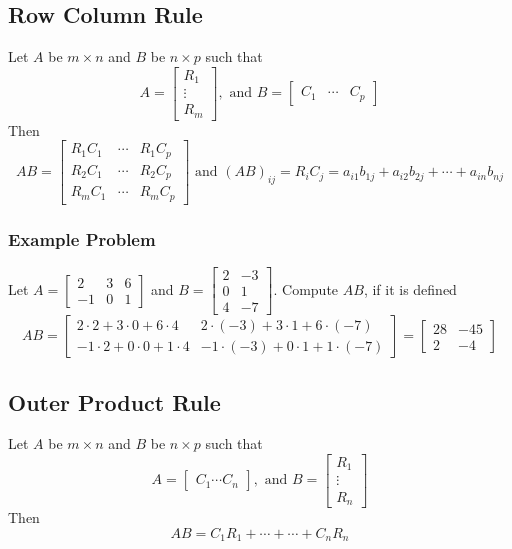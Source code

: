 \subsection{Row Column Rule}
Let $A$ be $m \times n$ and $B$ be $n \times p$ such that 
\[
  A = \begin{bmatrix}
    R_1 \\ \vdots \\ R_m
  \end{bmatrix}, \text{ and }
  B = \begin{bmatrix}
    C_1 & \cdots & C_p
  \end{bmatrix}
\]
Then 
\[
  AB = \begin{bmatrix}
    R_1C_1 & \cdots & R_1C_p \\
    R_2C_1 & \cdots & R_2C_p \\
    R_mC_1 & \cdots & R_mC_p
  \end{bmatrix} \text{ and }
  (AB)_{ij} = R_iC_j = a_{i1}b_{1j} + a_{i2}b_{2j} + \cdots 
  + a_{in}b_{nj}
\]
\subsubsection{Example Problem}
Let $A = \begin{bmatrix}
  2 & 3 & 6 \\
  -1 & 0 & 1
\end{bmatrix}$ and $B = \begin{bmatrix}
  2 & -3 \\
  0 & 1 \\
  4 & -7
\end{bmatrix}.$ Compute $AB$, if it is defined
\[
  AB = \begin{bmatrix}
    2 \cdot 2 + 3 \cdot 0 + 6 \cdot 4 & 2 \cdot (-3) + 3 \cdot 1 + 6 \cdot (-7) \\
    -1 \cdot 2 + 0 \cdot 0 + 1 \cdot 4 & -1 \cdot (-3) + 0 \cdot 1 + 1 \cdot (-7)
  \end{bmatrix} = \begin{bmatrix}
    28 & -45 \\
    2 & -4
  \end{bmatrix}
\]
\subsection{Outer Product Rule}
Let $A$ be $m \times n$ and $B$ be $n \times p$ such that
\[
  A = \begin{bmatrix}
    C_1 \cdots C_n
  \end{bmatrix}, \text{ and } B = \begin{bmatrix}
    R_1 \\
    \vdots \\
    R_n
  \end{bmatrix}
\]
Then 
\[
  AB = C_1R_1 + \cdots + \cdots + C_nR_n
\]
